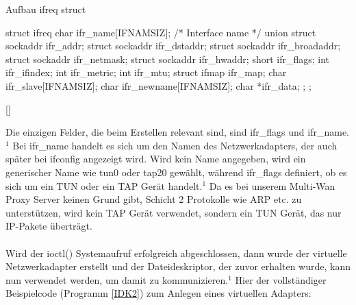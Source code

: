 \begin{program}[H]
    \caption{Aufbau ifreq struct}
    \label{IDK1}
    \begin{CppCode}
struct ifreq {
    char ifr_name[IFNAMSIZ]; /* Interface name */
    union {
        struct sockaddr ifr_addr;
        struct sockaddr ifr_dstaddr;
        struct sockaddr ifr_broadaddr;
        struct sockaddr ifr_netmask;
        struct sockaddr ifr_hwaddr;
        short           ifr_flags;
        int             ifr_ifindex;
        int             ifr_metric;
        int             ifr_mtu;
        struct ifmap    ifr_map;
        char            ifr_slave[IFNAMSIZ];
        char            ifr_newname[IFNAMSIZ];
        char           *ifr_data;
    };
};
    \end{CppCode}[\cite{SRV10}]
\end{program}
\noindent
Die einzigen Felder, die beim Erstellen relevant sind, sind ifr\_flags und ifr\_name.$^{1}$ Bei ifr\_name handelt es sich um den Namen des Netzwerkadapters, der auch später bei ifconfig angezeigt wird. Wird kein Name angegeben, wird ein generischer Name wie tun0 oder tap20 gewählt, während ifr\_flags definiert, ob es sich um ein TUN oder ein TAP Gerät handelt.$^{1}$ Da es bei unserem Multi-Wan Proxy Server keinen Grund gibt, Schicht 2 Protokolle wie ARP etc. zu unterstützen, wird kein TAP Gerät verwendet, sondern ein TUN Gerät, das nur IP-Pakete überträgt. 
\\\\ 
Wird der ioctl() Systemaufruf erfolgreich abgeschlossen, dann wurde der virtuelle Netzwerkadapter erstellt und der Dateideskriptor, der zuvor erhalten wurde, kann nun verwendet werden, um damit zu kommunizieren.$^{1}$ Hier der vollständiger Beispielcode (Programm \ref{IDK2}) zum Anlegen eines virtuellen Adapters:
